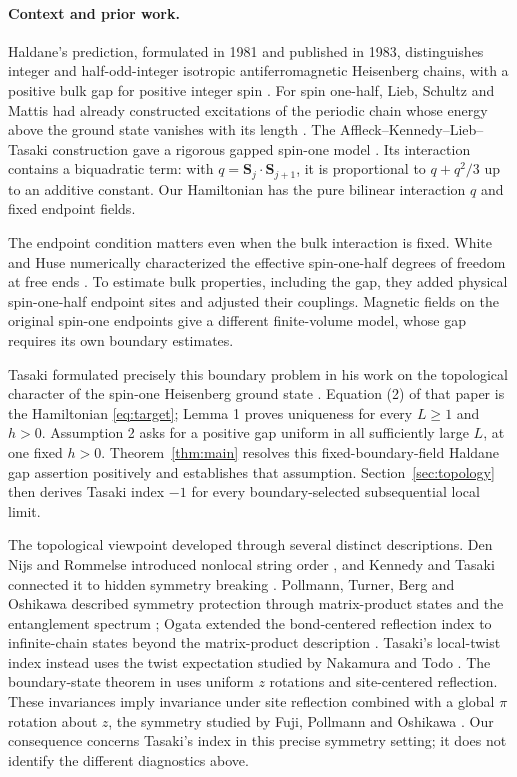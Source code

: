 \paragraph{Context and prior work.}
Haldane's prediction, formulated in 1981 and published in 1983,
distinguishes integer and half-odd-integer isotropic antiferromagnetic
Heisenberg chains, with a positive bulk gap for positive integer spin
\cite{Haldane1981,Haldane1983PLA,Haldane1983PRL}.
For spin one-half, Lieb, Schultz and Mattis had already constructed
excitations of the periodic chain whose energy above the ground state
vanishes with its length \cite[Appendix B]{LSM1961}.
The Affleck--Kennedy--Lieb--Tasaki construction gave a rigorous gapped
spin-one model \cite{AKLT1987,AKLT1988}. Its interaction contains a
biquadratic term: with $q=\mathbf S_j\cdot\mathbf S_{j+1}$, it is
proportional to $q+q^2/3$ up to an additive constant. Our Hamiltonian
has the pure bilinear interaction $q$ and fixed endpoint fields.

The endpoint condition matters even when the bulk interaction is
fixed. White and Huse numerically characterized the effective
spin-one-half degrees of freedom at free ends \cite{WhiteHuse1993}.
To estimate bulk properties, including the gap, they added physical
spin-one-half endpoint sites and adjusted their couplings. Magnetic
fields on the original spin-one endpoints give a different
finite-volume model, whose gap requires its own boundary estimates.

Tasaki formulated precisely this boundary problem in his work on the
topological character of the spin-one Heisenberg ground state
\cite{Tasaki2025}. Equation (2) of that paper is the Hamiltonian
\eqref{eq:target}; Lemma 1 proves uniqueness for every $L\ge1$ and
$h>0$. Assumption 2 asks for a positive gap uniform in all sufficiently
large $L$, at one fixed $h>0$. Theorem~\ref{thm:main} resolves this
fixed-boundary-field Haldane gap assertion positively and establishes
that assumption. Section~\ref{sec:topology} then derives Tasaki index
$-1$ for every boundary-selected subsequential local limit.

The topological viewpoint developed through several distinct
descriptions. Den Nijs and Rommelse introduced nonlocal string order
\cite{DenNijsRommelse1989}, and Kennedy and Tasaki connected it to
hidden symmetry breaking \cite{KennedyTasaki1992}. Pollmann, Turner,
Berg and Oshikawa described symmetry protection through matrix-product
states and the entanglement spectrum \cite{Pollmann2010}; Ogata
extended the bond-centered reflection index to infinite-chain states
beyond the matrix-product description \cite{Ogata2021}.
Tasaki's local-twist index \cite{Tasaki2018} instead uses the twist
expectation studied by Nakamura and Todo \cite{NakamuraTodo2002}.
The boundary-state theorem in \cite{Tasaki2025} uses uniform $z$
rotations and site-centered reflection. These invariances imply
invariance under site reflection combined with a global $\pi$ rotation
about $z$, the symmetry studied by Fuji, Pollmann and Oshikawa
\cite{FujiPollmannOshikawa2015}.
Our consequence concerns Tasaki's index in this precise symmetry
setting; it does not identify the different diagnostics above.

